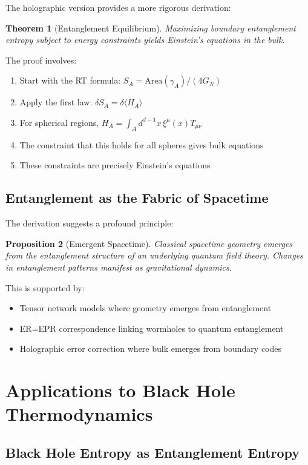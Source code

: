\documentclass[11pt,letterpaper]{article}
\newtheorem{theorem}{Theorem}[section]
\newtheorem{proposition}[theorem]{Proposition}
\begin{document}
The holographic version provides a more rigorous derivation:

\begin{theorem}[Entanglement Equilibrium]
Maximizing boundary entanglement entropy subject to energy constraints yields Einstein's equations in the bulk.
\end{theorem}

The proof involves:
\begin{enumerate}
\item Start with the RT formula: $S_A = \text{Area}(\gamma_A)/(4G_N)$
\item Apply the first law: $\delta S_A = \delta\langle H_A\rangle$
\item For spherical regions, $H_A = \int_A d^{d-1}x\, \xi^\mu(x) T_{\mu\nu}$
\item The constraint that this holds for all spheres gives bulk equations
\item These constraints are precisely Einstein's equations
\end{enumerate}

\subsection{Entanglement as the Fabric of Spacetime}

The derivation suggests a profound principle:

\begin{proposition}[Emergent Spacetime]
Classical spacetime geometry emerges from the entanglement structure of an underlying quantum field theory. Changes in entanglement patterns manifest as gravitational dynamics.
\end{proposition}

This is supported by:
\begin{itemize}
\item Tensor network models where geometry emerges from entanglement
\item ER=EPR correspondence linking wormholes to quantum entanglement
\item Holographic error correction where bulk emerges from boundary codes
\end{itemize}

\section{Applications to Black Hole Thermodynamics}

\subsection{Black Hole Entropy as Entanglement Entropy}
\end{document}
